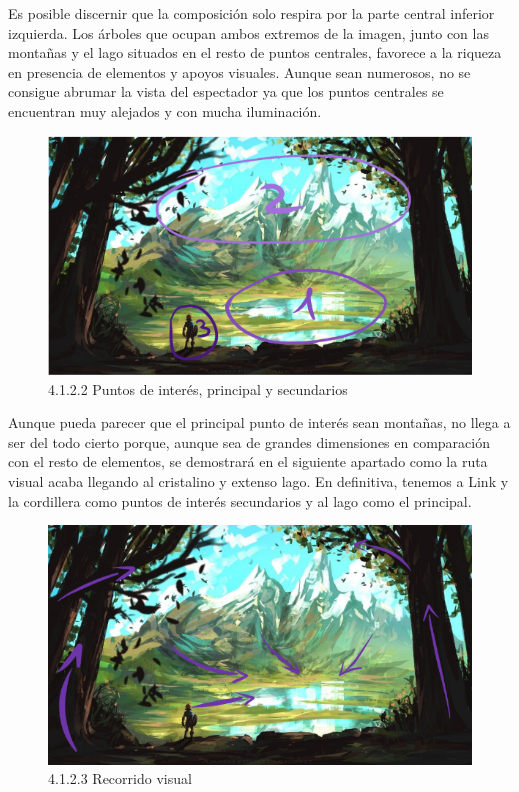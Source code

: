 \documentclass[12pt]{article}
\begin{document}
    Es posible discernir que la composición solo respira por la parte central inferior izquierda. Los árboles que ocupan ambos extremos de la imagen, junto con las montañas y el lago situados en el resto de puntos centrales, favorece a la riqueza en presencia de elementos y apoyos visuales. Aunque sean numerosos, no se consigue abrumar la vista del espectador ya que los puntos centrales se encuentran muy alejados y con mucha iluminación.

    \begin{figure}[H]
      \centering
      \includegraphics[scale=0.4]{images/Nerea/Nerea Zelda concept 122.PNG}
      \caption{\small 4.1.2.2 Puntos de interés, principal y secundarios}
    \end{figure}

    Aunque pueda parecer que el principal punto de interés sean montañas, no llega a ser del todo cierto porque, aunque sea de grandes dimensiones en comparación con el resto de elementos, se demostrará en el siguiente apartado como la ruta visual acaba llegando al cristalino y extenso lago. En definitiva, tenemos a Link y la cordillera como puntos de interés secundarios y al lago como el principal.

    \begin{figure}[H]
      \centering
      \includegraphics[scale=0.4]{images/Nerea/Nerea Zelda concept 123.PNG}
      \caption{\small 4.1.2.3 Recorrido visual}
    \end{figure}
\end{document}
